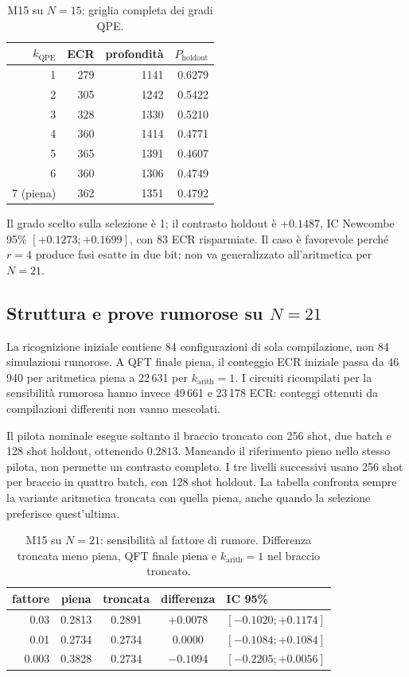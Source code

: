 \begin{table}[!htbp]
\centering
\small
\caption{M15 su $N=15$: griglia completa dei gradi QPE.}
\label{tab:aqft_n15_completa}
\begin{tabular}{rrrr}
\toprule
$k_{\mathrm{QPE}}$ & ECR & profondità & $P_{\mathrm{holdout}}$ \\
\midrule
1 & 279 & 1141 & 0.6279 \\
2 & 305 & 1242 & 0.5422 \\
3 & 328 & 1330 & 0.5210 \\
4 & 360 & 1414 & 0.4771 \\
5 & 365 & 1391 & 0.4607 \\
6 & 360 & 1306 & 0.4749 \\
7 (piena) & 362 & 1351 & 0.4792 \\
\bottomrule
\end{tabular}
\end{table}

Il grado scelto sulla selezione è 1; il contrasto holdout è $+0.1487$,
IC Newcombe 95\% $[+0.1273;+0.1699]$, con 83 ECR risparmiate.
Il caso è favorevole perché $r=4$ produce fasi esatte in due bit:
non va generalizzato all'aritmetica per $N=21$.

\subsection{Struttura e prove rumorose su \texorpdfstring{$N=21$}{N=21}}

La ricognizione iniziale contiene 84 configurazioni di sola compilazione,
non 84 simulazioni rumorose. A QFT finale piena, il conteggio ECR iniziale
passa da 46\,940 per aritmetica piena a 22\,631 per
$k_{\mathrm{arith}}=1$. I circuiti ricompilati per la sensibilità
rumorosa hanno invece 49\,661 e 23\,178 ECR: conteggi ottenuti da
compilazioni differenti non vanno mescolati.

Il pilota nominale esegue soltanto il braccio troncato con 256 shot,
due batch e 128 shot holdout, ottenendo $0.2813$. Mancando il riferimento
pieno nello stesso pilota, non permette un contrasto completo.
I tre livelli successivi usano 256 shot per braccio in quattro batch,
con 128 shot holdout. La tabella confronta sempre la variante
aritmetica troncata con quella piena, anche quando la selezione
preferisce quest'ultima.

\begin{table}[!htbp]
\centering
\small
\caption{M15 su $N=21$: sensibilità al fattore di rumore.
Differenza troncata meno piena, QFT finale piena e
$k_{\mathrm{arith}}=1$ nel braccio troncato.}
\label{tab:aqft_n21_sensibilita}
\begin{tabular}{rcccl}
\toprule
fattore & piena & troncata & differenza & IC 95\% \\
\midrule
0.03  & 0.2813 & 0.2891 & $+0.0078$ & $[-0.1020;+0.1174]$ \\
0.01  & 0.2734 & 0.2734 & $0.0000$ & $[-0.1084;+0.1084]$ \\
0.003 & 0.3828 & 0.2734 & $-0.1094$ & $[-0.2205;+0.0056]$ \\
\bottomrule
\end{tabular}
\end{table}

